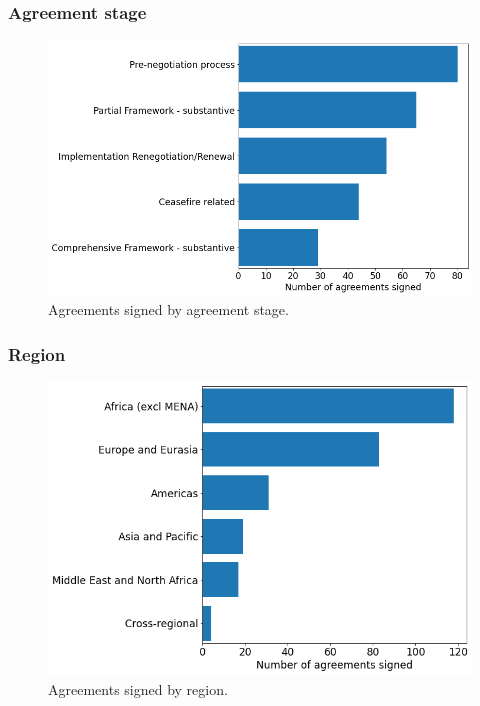\documentclass{article}
\begin{document}
\subsubsection{Agreement stage}

\begin{figure}[H]
\begin{center}
\includegraphics[scale=0.40]{./assets/figure_8.png}
\caption{Agreements signed by agreement stage.}
\end{center}
\end{figure}

\subsubsection{Region}

\begin{figure}[H]
\begin{center}
\includegraphics[scale=0.40]{./assets/figure_9.png}
\caption{Agreements signed by region.}
\end{center}
\end{figure}
\end{document}
